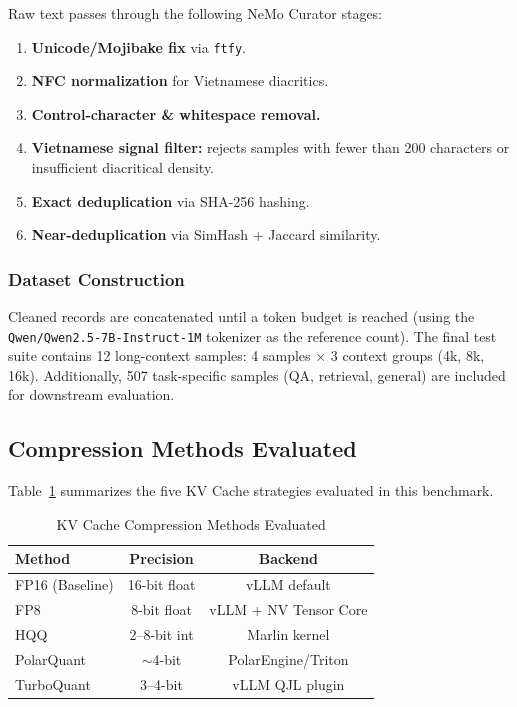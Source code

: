 \documentclass[10pt,twocolumn]{article}
\begin{document}
Raw text passes through the following NeMo Curator stages:
\begin{enumerate}
  \item \textbf{Unicode/Mojibake fix} via \texttt{ftfy}.
  \item \textbf{NFC normalization} for Vietnamese diacritics.
  \item \textbf{Control-character \& whitespace removal.}
  \item \textbf{Vietnamese signal filter:} rejects samples with
    fewer than 200 characters or insufficient diacritical density.
  \item \textbf{Exact deduplication} via SHA-256 hashing.
  \item \textbf{Near-deduplication} via SimHash + Jaccard similarity.
\end{enumerate}

\subsubsection{Dataset Construction}

Cleaned records are concatenated until a token budget is reached
(using the \texttt{Qwen/Qwen2.5-7B-Instruct-1M} tokenizer as the
reference count).
The final test suite contains 12 long-context samples:
4 samples $\times$ 3 context groups (4k, 8k, 16k).
Additionally, 507 task-specific samples (QA, retrieval, general)
are included for downstream evaluation.

\subsection{Compression Methods Evaluated}

Table~\ref{tab:methods} summarizes the five KV Cache strategies
evaluated in this benchmark.

\begin{table}[h]
\caption{KV Cache Compression Methods Evaluated}
\label{tab:methods}
\centering
\small
\begin{tabular}{@{}lcc@{}}
\toprule
\textbf{Method} & \textbf{Precision} & \textbf{Backend} \\
\midrule
FP16 (Baseline) & 16-bit float & vLLM default \\
FP8             & 8-bit float  & vLLM + NV Tensor Core \\
HQQ             & 2--8-bit int & Marlin kernel \\
PolarQuant      & $\sim$4-bit  & PolarEngine/Triton \\
TurboQuant      & 3--4-bit     & vLLM QJL plugin \\
\bottomrule
\end{tabular}
\end{table}
\end{document}
